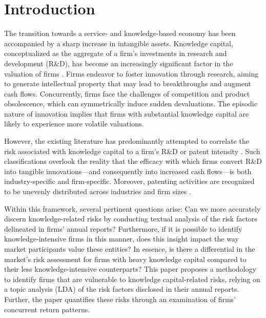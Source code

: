 \documentclass[12pt, letterpaper]{article}
\begin{document}
\newpage 

\onehalfspacing 

\section{Introduction}








The transition towards a service- and knowledge-based economy has been accompanied by a sharp increase in intangible assets. Knowledge capital, conceptualized as the aggregate of a firm's investments in research and development (R\&D), has become an increasingly significant factor in the valuation of firms \citep{Belo2019-iz}. Firms endeavor to foster innovation through research, aiming to generate intellectual property that may lead to breakthroughs and augment cash flows. Concurrently, firms face the challenges of competition and product obsolescence, which can symmetrically induce sudden devaluations. The episodic nature of innovation implies that firms with substantial knowledge capital are likely to experience more volatile valuations. 

However, the existing literature has predominantly attempted to correlate the risk associated with knowledge capital to a firm's R\&D or patent intensity \citep{Andrei2019-bh}. Such classifications overlook the reality that the efficacy with which firms convert R\&D into tangible innovations—and consequently into increased cash flows—is both industry-specific and firm-specific. Moreover, patenting activities are recognized to be unevenly distributed across industries and firm sizes \citep{mezzanotti2023innovation, Li2020-xc}. 

Within this framework, several pertinent questions arise: Can we more accurately discern knowledge-related risks by conducting textual analysis of the risk factors delineated in firms' annual reports? Furthermore, if it is possible to identify knowledge-intensive firms in this manner, does this insight impact the way market participants value these entities? In essence, is there a differential in the market's risk assessment for firms with heavy knowledge capital compared to their less knowledge-intensive counterparts? This paper proposes a methodology to identify firms that are vulnerable to knowledge capital-related risks, relying on a topic analysis (LDA) of the risk factors disclosed in their annual reports. Further, the paper quantifies these risks through an examination of firms' concurrent return patterns.
\end{document}
